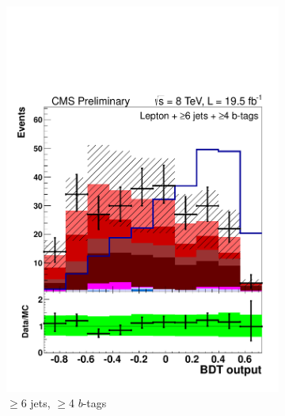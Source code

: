 \begin{figure}[hbtp]
\begin{subfigure}[hbtp]{0.31\textwidth}
     \includegraphics[width=\textwidth]{Figures/Analysis_2_Diagrams/LJ_plots_lep/6j4t/lep_disc_final10v16_8TeV_CFMlpANN_BDT_6j4t_cumulative_wRatio_noLegend_lin.pdf}
     \caption{$\ge$6 jets, $\ge$4 $b$-tags}\label{lj_BDToutput_8TeV_7}
   \end{subfigure}
   ~ %
   \begin{subfigure}[hbtp]{0.15\textwidth}

\end{subfigure}
\end{figure}
